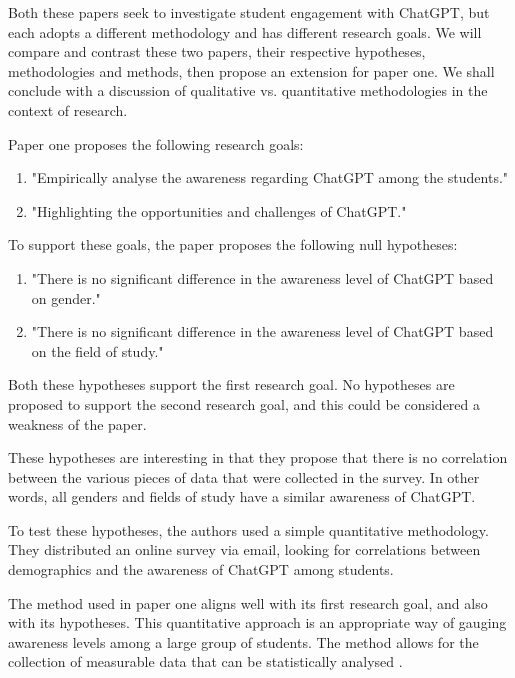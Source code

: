 \documentclass[12pt]{article}
\begin{document}
Both these papers seek to investigate student engagement with ChatGPT, but each adopts a different methodology and has different research goals. We will compare and contrast these two papers, their respective hypotheses, methodologies and methods, then propose an extension for paper one. We shall conclude with a discussion of qualitative vs. quantitative methodologies in the context of research. 

Paper one proposes the following research goals:

\begin{enumerate}
    \item "Empirically analyse the awareness regarding ChatGPT among the students." 
    \item "Highlighting the opportunities and challenges of ChatGPT." \cite{paper1}
\end{enumerate}

To support these goals, the paper proposes the following null hypotheses:

\begin{enumerate}
    \item "There is no significant difference in the awareness level of ChatGPT based on gender."
    \item "There is no significant difference in the awareness level of ChatGPT based on the field of study." \cite{paper1}
\end{enumerate}

Both these hypotheses support the first research goal. No hypotheses are proposed to support the second research goal, and this could be considered a weakness of the paper.

These hypotheses are interesting in that they propose that there is no correlation between the various pieces of data that were collected in the survey. In other words, all genders and fields of study have a similar awareness of ChatGPT.

To test these hypotheses, the authors used a simple quantitative methodology. They distributed an online survey via email, looking for correlations between demographics and the awareness of ChatGPT among students.

The method used in paper one aligns well with its first research goal, and also with its hypotheses. This quantitative approach is an appropriate way of gauging awareness levels among a large group of students. The method allows for the collection of measurable data that can be statistically analysed \cite{cresswell}.
\end{document}
